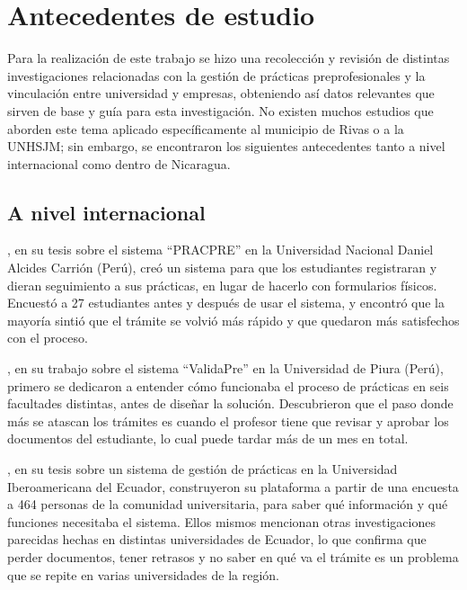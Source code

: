 \newpage

\section{Antecedentes de estudio}

Para la realización de este trabajo se hizo una recolección y revisión de distintas investigaciones relacionadas con la gestión de prácticas preprofesionales y la vinculación entre universidad y empresas, obteniendo así datos relevantes que sirven de base y guía para esta investigación. No existen muchos estudios que aborden este tema aplicado específicamente al municipio de Rivas o a la UNHSJM; sin embargo, se encontraron los siguientes antecedentes tanto a nivel internacional como dentro de Nicaragua.

\subsection{A nivel internacional}

\textcite{paucar2022}, en su tesis sobre el sistema ``PRACPRE'' en la Universidad Nacional Daniel Alcides Carrión (Perú), creó un sistema para que los estudiantes registraran y dieran seguimiento a sus prácticas, en lugar de hacerlo con formularios físicos. Encuestó a 27 estudiantes antes y después de usar el sistema, y encontró que la mayoría sintió que el trámite se volvió más rápido y que quedaron más satisfechos con el proceso.

\textcite{gomezatoche2025}, en su trabajo sobre el sistema ``ValidaPre'' en la Universidad de Piura (Perú), primero se dedicaron a entender cómo funcionaba el proceso de prácticas en seis facultades distintas, antes de diseñar la solución. Descubrieron que el paso donde más se atascan los trámites es cuando el profesor tiene que revisar y aprobar los documentos del estudiante, lo cual puede tardar más de un mes en total.

\textcite{delgadoosorio2024}, en su tesis sobre un sistema de gestión de prácticas en la Universidad Iberoamericana del Ecuador, construyeron su plataforma a partir de una encuesta a 464 personas de la comunidad universitaria, para saber qué información y qué funciones necesitaba el sistema. Ellos mismos mencionan otras investigaciones parecidas hechas en distintas universidades de Ecuador, lo que confirma que perder documentos, tener retrasos y no saber en qué va el trámite es un problema que se repite en varias universidades de la región.

